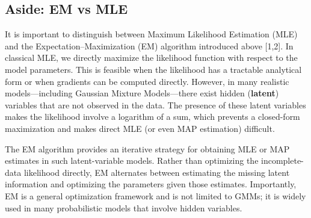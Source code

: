 \documentclass{article}
\renewcommand{\cite}[1]{[#1]}
\begin{document}

\subsection{Aside: EM vs MLE}

It is important to distinguish between Maximum Likelihood Estimation (MLE) and the Expectation–Maximization (EM) algorithm introduced above \cite{1,2}. In classical MLE, we directly maximize the likelihood function with respect to the model parameters. This is feasible when the likelihood has a tractable analytical form or when gradients can be computed directly. However, in many realistic models—including Gaussian Mixture Models—there exist hidden (\textbf{latent}) variables that are not observed in the data. The presence of these latent variables makes the likelihood involve a logarithm of a sum, which prevents a closed-form maximization and makes direct MLE (or even MAP estimation) difficult.

The EM algorithm provides an iterative strategy for obtaining MLE or MAP estimates in such latent-variable models. Rather than optimizing the incomplete-data likelihood directly, EM alternates between estimating the missing latent information and optimizing the parameters given those estimates. Importantly, EM is a general optimization framework and is not limited to GMMs; it is widely used in many probabilistic models that involve hidden variables.
\end{document}
